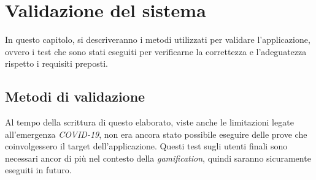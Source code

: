 
\chapter{Validazione del sistema}
\label{ch:Chapter6}

In questo capitolo, si descriveranno i metodi utilizzati per validare
l'applicazione, ovvero i test che sono stati eseguiti per verificarne la
correttezza e l’adeguatezza rispetto i requisiti preposti.

\section{Metodi di validazione}
\label{sec:Section6.1}

Al tempo della scrittura di questo elaborato, viste anche le limitazioni legate
all'emergenza \textit{COVID-19}, non era ancora stato possibile eseguire delle
prove che coinvolgessero il target dell'applicazione. Questi test sugli utenti
finali sono necessari ancor di più nel contesto della \textit{gamification},
quindi saranno sicuramente eseguiti in futuro.


